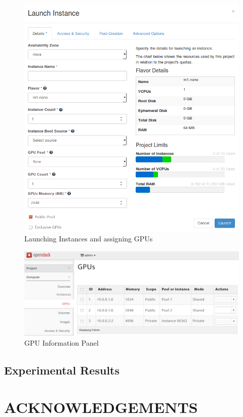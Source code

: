 \documentclass[a4paper,twoside]{article}
\begin{document}
\begin{figure}[!t]
  \centering
  \includegraphics[width=.9\linewidth]{images/UI-launch.jpg}
  \caption{Launching Instances and assigning GPUs}
  \label{fig:ui-launch}
\end{figure}
  
\begin{figure}[!t]
  \centering
  \includegraphics[width=.85\linewidth]{images/UI-rgpus.jpg}
  \caption{GPU Information Panel}
  \label{fig:ui-rgpus}
\end{figure}

\subsection{Experimental Results}


\section*{\uppercase{Acknowledgements}}


{\small
}
\end{document}
